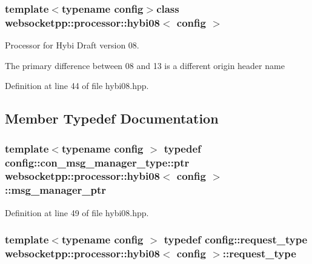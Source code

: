 \subsubsection*{template$<$typename config$>$class websocketpp\+::processor\+::hybi08$<$ config $>$}

Processor for Hybi Draft version 08. 

The primary difference between 08 and 13 is a different origin header name 

Definition at line 44 of file hybi08.\+hpp.



\subsection{Member Typedef Documentation}
\hypertarget{classwebsocketpp_1_1processor_1_1hybi08_a4ad1477463712031772e8e8a48cdc7b0}{}
\subsubsection[{msg\+\_\+manager\+\_\+ptr}]{\setlength{\rightskip}{0pt plus 5cm}template$<$typename config $>$ typedef config\+::con\+\_\+msg\+\_\+manager\+\_\+type\+::ptr {\bf websocketpp\+::processor\+::hybi08}$<$ config $>$\+::{\bf msg\+\_\+manager\+\_\+ptr}}\label{classwebsocketpp_1_1processor_1_1hybi08_a4ad1477463712031772e8e8a48cdc7b0}


Definition at line 49 of file hybi08.\+hpp.

\hypertarget{classwebsocketpp_1_1processor_1_1hybi08_a5cb5a8054a9e10706e672de379284a2e}{}
\subsubsection[{request\+\_\+type}]{\setlength{\rightskip}{0pt plus 5cm}template$<$typename config $>$ typedef config\+::request\+\_\+type {\bf websocketpp\+::processor\+::hybi08}$<$ config $>$\+::{\bf request\+\_\+type}}\label{classwebsocketpp_1_1processor_1_1hybi08_a5cb5a8054a9e10706e672de379284a2e}



